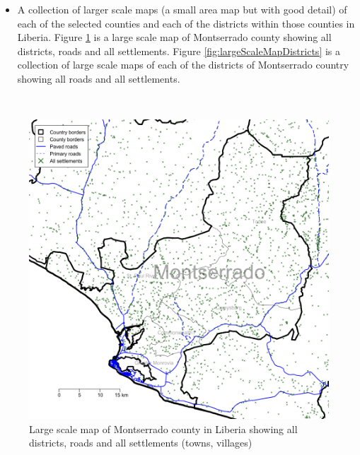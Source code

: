 \documentclass[12pt,a4paper]{book}
\providecommand{\tightlist}{%
  \setlength{\itemsep}{0pt}\setlength{\parskip}{0pt}}
\theoremstyle{definition}
\theoremstyle{definition}
\theoremstyle{definition}
\theoremstyle{remark}
\begin{document}
\begin{itemize}
\tightlist
\item
  A collection of larger scale maps (a small area map but with good
  detail) of each of the selected counties and each of the districts
  within those counties in Liberia. Figure \ref{fig:largeScaleMapCounty}
  is a large scale map of Montserrado county showing all districts,
  roads and all settlements. Figure \ref{fig:largeScaleMapDistricts} is
  a collection of large scale maps of each of the districts of
  Montserrado country showing all roads and all settlements.
\end{itemize}

~

\begin{figure}[H]

{\centering \includegraphics{figures/largeScaleMapCounty-1} 

}

\caption{Large scale map of Montserrado county in Liberia showing all districts, roads and all settlements (towns, villages)}\label{fig:largeScaleMapCounty}
\end{figure}

\newpage
\end{document}
